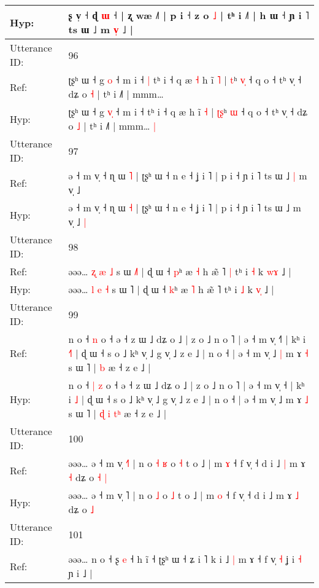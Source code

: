 \documentclass[10pt]{article}
\DeclareRobustCommand{\hl}[1]{{\textcolor{red}{#1}}}
\begin{document}
\begin{longtable}{ll}
 \\
Hyp: & ʂ v̩ ˧ ɖ \hl{}\hl{ɯ} ˧ | ʐ wæ ˩˥ | p i ˧ z o \hl{˩} | tʰ i ˩˥ | h ɯ ˧ ɲ i ˥ ts ɯ ˩ m \hl{v}\hl{̩} ˩ |
 \\
\midrule
Utterance ID: & 96 \\
Ref: & ʈʂʰ ɯ ˧ g \hl{}\hl{o} ˧ m i ˧\hl{ }\hl{|} tʰ i ˧ q æ\hl{ }\hl{˧} h ĩ \hl{˥} | \hl{}\hl{t}ʰ \hl{v}\hl{̩} ˧ q o ˧ tʰ v̩ ˧ dʑ o \hl{˧} | tʰ i ˩˥ | mmm…\hl{}\hl{}
 \\
Hyp: & ʈʂʰ ɯ ˧ g \hl{v}\hl{̩} ˧ m i ˧\hl{}\hl{} tʰ i ˧ q æ\hl{}\hl{} h ĩ \hl{˧} | \hl{ʈ}\hl{ʂ}ʰ \hl{}\hl{ɯ} ˧ q o ˧ tʰ v̩ ˧ dʑ o \hl{˩} | tʰ i ˩˥ | mmm…\hl{ }\hl{|}
 \\
\midrule
Utterance ID: & 97 \\
Ref: & ə ˧ m v̩ ˧ ɳ ɯ \hl{˥} | ʈʂʰ ɯ ˧ n e ˧ ʝ i ˥ | p i ˧ ɲ i ˥ ts ɯ ˩\hl{ }\hl{|} m v̩ ˩\hl{}\hl{}
 \\
Hyp: & ə ˧ m v̩ ˧ ɳ ɯ \hl{˧} | ʈʂʰ ɯ ˧ n e ˧ ʝ i ˥ | p i ˧ ɲ i ˥ ts ɯ ˩\hl{}\hl{} m v̩ ˩\hl{ }\hl{|}
 \\
\midrule
Utterance ID: & 98 \\
Ref: & əəə… \hl{ʐ} \hl{æ} \hl{˩} s ɯ \hl{˩}˥ | ɖ ɯ ˧ \hl{p}ʰ æ \hl{˧} h æ̃ ˥\hl{ }\hl{|} tʰ i \hl{˧} k \hl{w}\hl{ɤ} ˩ |
 \\
Hyp: & əəə… \hl{l} \hl{e} \hl{˧} s ɯ \hl{}˥ | ɖ ɯ ˧ \hl{k}ʰ æ \hl{˥} h æ̃ ˥\hl{}\hl{} tʰ i \hl{˩} k \hl{v}\hl{̩} ˩ |
 \\
\midrule
Utterance ID: & 99 \\
Ref: & n o ˧\hl{}\hl{} \hl{n} o ˧ ə ˧ z ɯ ˩ dʑ o ˩ | z o ˩ n o ˥ | ə ˧ m v̩ ˧\hl{˥} | kʰ i \hl{˧}\hl{˥} | ɖ ɯ ˧ s o ˩ kʰ v̩ ˩ g v̩ ˩ z e ˩ | n o ˧ | ə ˧ m v̩ ˩\hl{ }\hl{|} m ɤ \hl{˧} s ɯ ˥ |\hl{}\hl{}\hl{}\hl{} \hl{}\hl{b} æ ˧ z e ˩ |
 \\
Hyp: & n o ˧\hl{ }\hl{|} \hl{z} o ˧ ə ˧ z ɯ ˩ dʑ o ˩ | z o ˩ n o ˥ | ə ˧ m v̩ ˧\hl{} | kʰ i \hl{}\hl{˩} | ɖ ɯ ˧ s o ˩ kʰ v̩ ˩ g v̩ ˩ z e ˩ | n o ˧ | ə ˧ m v̩ ˩\hl{}\hl{} m ɤ \hl{˩} s ɯ ˥ |\hl{ }\hl{ɖ}\hl{ }\hl{i} \hl{t}\hl{ʰ} æ ˧ z e ˩ |
 \\
\midrule
Utterance ID: & 100 \\
Ref: & əəə… ə ˧ m v̩ \hl{˧}˥ | n o\hl{ }\hl{˧} \hl{ʁ} o \hl{˧} t o ˩ | m \hl{ɤ} ˧ f v̩ ˧ d i ˩\hl{ }\hl{|} m ɤ \hl{˧} dʑ o\hl{ }\hl{˧} \hl{|}
 \\
Hyp: & əəə… ə ˧ m v̩ \hl{}˥ | n o\hl{}\hl{} \hl{˩} o \hl{˩} t o ˩ | m \hl{o} ˧ f v̩ ˧ d i ˩\hl{}\hl{} m ɤ \hl{˩} dʑ o\hl{}\hl{} \hl{˩}
 \\
\midrule
Utterance ID: & 101 \\
Ref: & əəə… n o ˧ ʂ \hl{e} ˧ h ĩ ˧ ʈʂʰ ɯ ˧ ʑ i ˥ k i ˩\hl{ }\hl{|} m ɤ ˧ f v̩\hl{}\hl{}\hl{}\hl{}\hl{}\hl{} \hl{˧} ʝ i \hl{˧} ɲ i ˩ |

\end{longtable}
\end{document}
